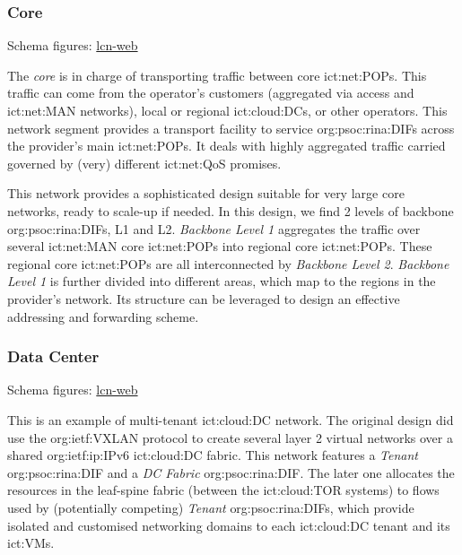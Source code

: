 \subsubsection{Core}
\label{sec:examples:af-d22:core}
Schema figures: \href{https://vdmeer.github.io/skb/ipc/lcn-examples/arcfire/af-d22-core/index.html}{lcn-web}

The \textit{core} is in charge of transporting traffic between core \acp{ict:net:POP}.
This traffic can come from
    the operator's customers (aggregated via access and \ac{ict:net:MAN} networks),
    local or regional \acp{ict:cloud:DC}, or
    other operators.
This network segment provides a transport facility to service \acp{org:psoc:rina:DIF} across the provider's main \acp{ict:net:POP}.
It deals with highly aggregated traffic carried governed by (very) different \ac{ict:net:QoS} promises.

This network provides a sophisticated design suitable for very large core networks, ready to scale-up if needed.
In this design, we find 2 levels of backbone \acp{org:psoc:rina:DIF}, L1 and L2.
\textit{Backbone Level 1} aggregates the traffic over several \ac{ict:net:MAN} core \acp{ict:net:POP} into regional core \acp{ict:net:POP}.
These regional core \acp{ict:net:POP} are all interconnected by \textit{Backbone Level 2}.
\textit{Backbone Level 1} is further divided into different areas, which map to the regions in the provider's network.
Its structure can be leveraged to design an effective addressing and forwarding scheme.




\subsubsection{Data Center}
\label{sec:examples:af-d22:dc}
Schema figures: \href{https://vdmeer.github.io/skb/ipc/lcn-examples/arcfire/af-d22-dc/index.html}{lcn-web}

This is an example of multi-tenant \ac{ict:cloud:DC} network.
The original design did use the \acs{org:ietf:VXLAN} protocol to create several layer 2 virtual networks over a shared \acs{org:ietf:ip:IPv6} \ac{ict:cloud:DC} fabric.
This network features a \textit{Tenant} \ac{org:psoc:rina:DIF} and a \textit{DC Fabric} \ac{org:psoc:rina:DIF}.
The later one allocates the resources in the leaf-spine fabric (between the \acs{ict:cloud:TOR} systems) to flows used by (potentially competing) \textit{Tenant} \acp{org:psoc:rina:DIF}, which provide isolated and customised networking domains to each \ac{ict:cloud:DC} tenant and its \acsp{ict:VM}.




